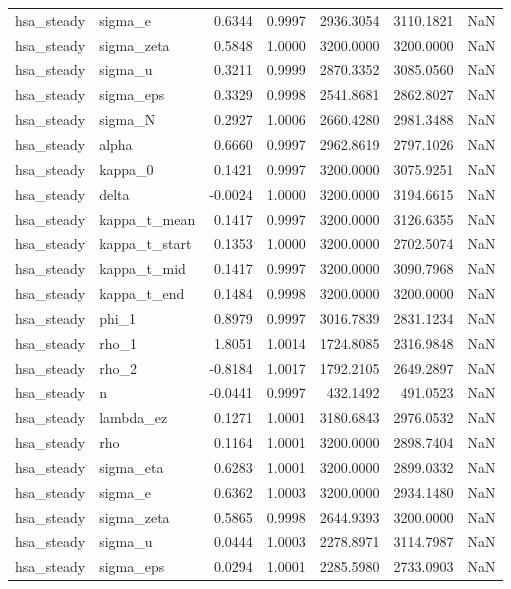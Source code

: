 \begin{tabular}{llrrrrl}
hsa\_steady & sigma\_e & 0.6344 & 0.9997 & 2936.3054 & 3110.1821 & NaN \\
hsa\_steady & sigma\_zeta & 0.5848 & 1.0000 & 3200.0000 & 3200.0000 & NaN \\
hsa\_steady & sigma\_u & 0.3211 & 0.9999 & 2870.3352 & 3085.0560 & NaN \\
hsa\_steady & sigma\_eps & 0.3329 & 0.9998 & 2541.8681 & 2862.8027 & NaN \\
hsa\_steady & sigma\_N & 0.2927 & 1.0006 & 2660.4280 & 2981.3488 & NaN \\
hsa\_steady & alpha & 0.6660 & 0.9997 & 2962.8619 & 2797.1026 & NaN \\
hsa\_steady & kappa\_0 & 0.1421 & 0.9997 & 3200.0000 & 3075.9251 & NaN \\
hsa\_steady & delta & -0.0024 & 1.0000 & 3200.0000 & 3194.6615 & NaN \\
hsa\_steady & kappa\_t\_mean & 0.1417 & 0.9997 & 3200.0000 & 3126.6355 & NaN \\
hsa\_steady & kappa\_t\_start & 0.1353 & 1.0000 & 3200.0000 & 2702.5074 & NaN \\
hsa\_steady & kappa\_t\_mid & 0.1417 & 0.9997 & 3200.0000 & 3090.7968 & NaN \\
hsa\_steady & kappa\_t\_end & 0.1484 & 0.9998 & 3200.0000 & 3200.0000 & NaN \\
hsa\_steady & phi\_1 & 0.8979 & 0.9997 & 3016.7839 & 2831.1234 & NaN \\
hsa\_steady & rho\_1 & 1.8051 & 1.0014 & 1724.8085 & 2316.9848 & NaN \\
hsa\_steady & rho\_2 & -0.8184 & 1.0017 & 1792.2105 & 2649.2897 & NaN \\
hsa\_steady & n & -0.0441 & 0.9997 & 432.1492 & 491.0523 & NaN \\
hsa\_steady & lambda\_ez & 0.1271 & 1.0001 & 3180.6843 & 2976.0532 & NaN \\
hsa\_steady & rho & 0.1164 & 1.0001 & 3200.0000 & 2898.7404 & NaN \\
hsa\_steady & sigma\_eta & 0.6283 & 1.0001 & 3200.0000 & 2899.0332 & NaN \\
hsa\_steady & sigma\_e & 0.6362 & 1.0003 & 3200.0000 & 2934.1480 & NaN \\
hsa\_steady & sigma\_zeta & 0.5865 & 0.9998 & 2644.9393 & 3200.0000 & NaN \\
hsa\_steady & sigma\_u & 0.0444 & 1.0003 & 2278.8971 & 3114.7987 & NaN \\
hsa\_steady & sigma\_eps & 0.0294 & 1.0001 & 2285.5980 & 2733.0903 & NaN \\

\end{tabular}
